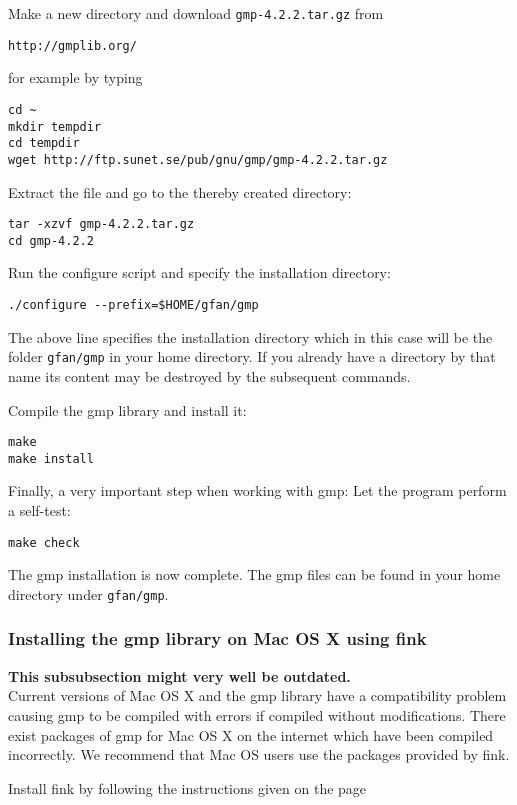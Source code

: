 \vspace{0.3cm}
\noindent
Make a new directory and download {\tt gmp-4.2.2.tar.gz} from

\centerline{\tt http://gmplib.org/}

\noindent
for example by typing
\begin{verbatim}
cd ~
mkdir tempdir
cd tempdir
wget http://ftp.sunet.se/pub/gnu/gmp/gmp-4.2.2.tar.gz
\end{verbatim}
Extract the file and go to the thereby created directory:
\begin{verbatim}
tar -xzvf gmp-4.2.2.tar.gz
cd gmp-4.2.2
\end{verbatim}
Run the configure script and specify the installation directory:
\begin{verbatim}
./configure --prefix=$HOME/gfan/gmp
\end{verbatim}
The above line specifies the installation directory which in this case
will be the folder {\tt gfan/gmp} in your home directory. If you already have
a directory by that name its content may be destroyed by the subsequent commands.

Compile the gmp library and install it:
\begin{verbatim}
make
make install
\end{verbatim}
Finally, a very important step when working with gmp: Let the program
perform a self-test:
\begin{verbatim}
make check
\end{verbatim}
The gmp installation is now complete. The gmp files can be found in your
home directory under {\tt gfan/gmp}.

\subsubsection{Installing the gmp library on Mac OS X using fink}
\label{sec:fink}
{\bf This subsubsection might very well be outdated.}\\
Current versions of Mac OS X and the gmp library have a compatibility
problem causing gmp to be compiled with errors if compiled without
modifications. There exist packages of gmp for Mac OS X on the internet
which have been compiled incorrectly. We recommend that Mac OS users
use the packages provided by fink.

\vspace{0.3cm}

\noindent
Install fink by following the instructions given on the page

